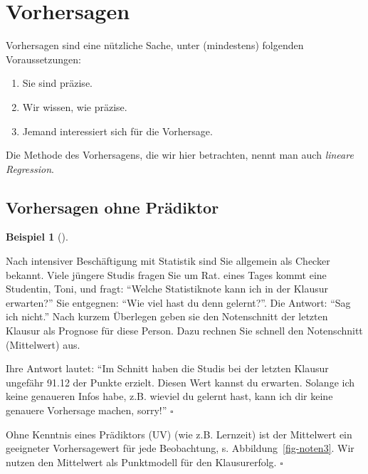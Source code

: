 \documentclass[
  letterpaper,
  oneside,
  open=any]{scrbook}
\providecommand{\tightlist}{%
  \setlength{\itemsep}{0pt}\setlength{\parskip}{0pt}}\usepackage{longtable,booktabs,array}
\theoremstyle{definition}
\theoremstyle{definition}
\newtheorem{example}{Beispiel}[chapter]
\theoremstyle{definition}
\theoremstyle{remark}
\begin{document}
\section{Vorhersagen}\label{vorhersagen}

Vorhersagen sind eine nützliche Sache, unter (mindestens) folgenden
Voraussetzungen:

\begin{enumerate}
\def\labelenumi{\arabic{enumi}.}
\tightlist
\item
  Sie sind präzise.
\item
  Wir wissen, wie präzise.
\item
  Jemand interessiert sich für die Vorhersage.
\end{enumerate}

Die Methode des Vorhersagens, die wir hier betrachten, nennt man auch
\emph{lineare Regression}.

\subsection{Vorhersagen ohne
Prädiktor}\label{vorhersagen-ohne-pruxe4diktor}

\begin{example}[]\protect\hypertarget{exm-noten-prognose}{}\label{exm-noten-prognose}

Nach intensiver Beschäftigung mit Statistik sind Sie allgemein als
Checker bekannt. Viele jüngere Studis fragen Sie um Rat. eines Tages
kommt eine Studentin, Toni, und fragt: \enquote{Welche Statistiknote
kann ich in der Klausur erwarten?} Sie entgegnen: \enquote{Wie viel hast
du denn gelernt?}. Die Antwort: \enquote{Sag ich nicht.} Nach kurzem
Überlegen geben sie den Notenschnitt der letzten Klausur als Prognose
für diese Person. Dazu rechnen Sie schnell den Notenschnitt (Mittelwert)
aus.

Ihre Antwort lautet: \enquote{Im Schnitt haben die Studis bei der
letzten Klausur ungefähr 91.12 der Punkte erzielt. Diesen Wert kannst du
erwarten. Solange ich keine genaueren Infos habe, z.B. wieviel du
gelernt hast, kann ich dir keine genauere Vorhersage machen, sorry!}
\(\square\)

\end{example}

Ohne Kenntnis eines Prädiktors (UV) (wie z.B. Lernzeit) ist der
Mittelwert ein geeigneter Vorhersagewert für jede Beobachtung, s.
Abbildung~\ref{fig-noten3}. Wir nutzen den Mittelwert als Punktmodell
für den Klausurerfolg. \(\square\)
\end{document}
